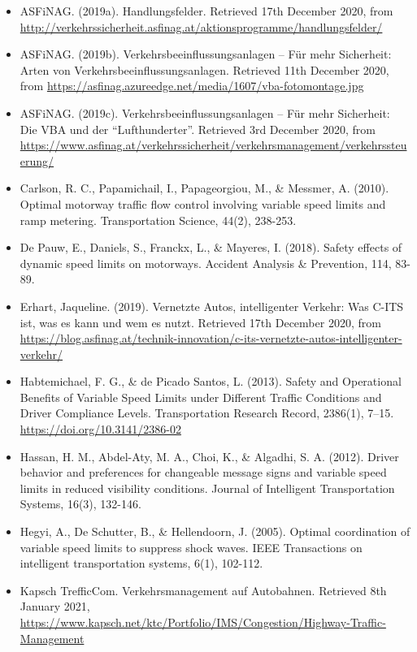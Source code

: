 \documentclass[
]{book}
\providecommand{\tightlist}{%
  \setlength{\itemsep}{0pt}\setlength{\parskip}{0pt}}
\begin{document}
\begin{itemize}
\tightlist
\item
  ASFiNAG. (2019a). Handlungsfelder. Retrieved 17th December 2020, from \url{http://verkehrssicherheit.asfinag.at/aktionsprogramme/handlungsfelder/}
\item
  ASFiNAG. (2019b). Verkehrsbeeinflussungsanlagen -- Für mehr Sicherheit: Arten von Verkehrsbeeinflussungsanlagen. Retrieved 11th December 2020, from \url{https://asfinag.azureedge.net/media/1607/vba-fotomontage.jpg}
\item
  ASFiNAG. (2019c). Verkehrsbeeinflussungsanlagen -- Für mehr Sicherheit: Die VBA und der ``Lufthunderter''. Retrieved 3rd December 2020, from \url{https://www.asfinag.at/verkehrssicherheit/verkehrsmanagement/verkehrssteuerung/}
\item
  Carlson, R. C., Papamichail, I., Papageorgiou, M., \& Messmer, A. (2010). Optimal motorway traffic flow control involving variable speed limits and ramp metering. Transportation Science, 44(2), 238-253.
\item
  De Pauw, E., Daniels, S., Franckx, L., \& Mayeres, I. (2018). Safety effects of dynamic speed limits on motorways. Accident Analysis \& Prevention, 114, 83-89.
\item
  Erhart, Jaqueline. (2019). Vernetzte Autos, intelligenter Verkehr: Was C-ITS ist, was es kann und wem es nutzt. Retrieved 17th December 2020, from \url{https://blog.asfinag.at/technik-innovation/c-its-vernetzte-autos-intelligenter-verkehr/}\\
\item
  Habtemichael, F. G., \& de Picado Santos, L. (2013). Safety and Operational Benefits of Variable Speed Limits under Different Traffic Conditions and Driver Compliance Levels. Transportation Research Record, 2386(1), 7--15. \url{https://doi.org/10.3141/2386-02}
\item
  Hassan, H. M., Abdel-Aty, M. A., Choi, K., \& Algadhi, S. A. (2012). Driver behavior and preferences for changeable message signs and variable speed limits in reduced visibility conditions. Journal of Intelligent Transportation Systems, 16(3), 132-146.
\item
  Hegyi, A., De Schutter, B., \& Hellendoorn, J. (2005). Optimal coordination of variable speed limits to suppress shock waves. IEEE Transactions on intelligent transportation systems, 6(1), 102-112.
\item
  Kapsch TrefficCom. Verkehrsmanagement auf Autobahnen. Retrieved 8th January 2021, \url{https://www.kapsch.net/ktc/Portfolio/IMS/Congestion/Highway-Traffic-Management}

\end{itemize}
\end{document}
